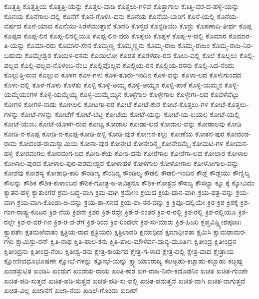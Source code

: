 {ಕೊತ್ತತ್ತಿ
ಕೊತ್ತತ್ತಿಯ
ಕೊತ್ತತ್ತಿ-ಯನ್ನು
ಕೊತ್ತಲ-ವಾಡಿ
ಕೊತ್ತಲು-ಗಳಿವೆ
ಕೊತ್ತಾಗಾಲ
ಕೊತ್ತಿ-ವರ-ದ-ಹಳ್ಳಿ-ಯನ್ನು
ಕೊನಯ
ಕೊನೆಗಾಲ-ದಲ್ಲಿ
ಕೊನೆಗೆ
ಕೊನೆ-ಗೊಳಿಸಿ-ದನು
ಕೊನೆಯ
ಕೊನೆಯ-ಬಾರಿಗೆ
ಕೊನೆ-ಯಲ್ಲಿ
ಕೊನೆಯ-ವರ್ಷದ
ಕೊನೆ-ಯಾದ
ಕೊನೆಯು-ಸಿರೆಳೆಯುತ್ತಾನೆ
ಕೊನೆರಿ
ಕೊನ್ತದ
ಕೊನ್ದಡಿಯು
ಕೊನ್ದು
ಕೊಪಣಾದಿ-ತೀರ್ಥ
ಕೊಪ್ಪ
ಕೊಪ್ಪದ
ಕೊಪ್ಪ-ಲಿನ
ಕೊಪ್ಪ-ಲಿನಲ್ಲಿಯೂ
ಕೊಪ್ಪ-ಲಿನ-ವರು
ಕೊಪ್ಪಲು
ಕೊಪ್ಪಳ
ಕೊಪ್ಪ-ಳ-ದಲ್ಲಿ
ಕೊಮಾರ
ಕೊಮಾರ-ತಿ-ಯನ್ನು
ಕೊಮಾ-ರರು
ಕೊಮಾರ-ಸೇನ
ಕೊಮ್ಮಣ್ಣ
ಕೊಮ್ಮಣ್ಣನು
ಕೊಮ್ಮ-ರಾಜ
ಕೊಮ್ಮ-ರಾಜಂ
ಕೊಮ್ಮ-ರಾಜ-ನಿರ-ಬಹುದು
ಕೊಮ್ಮೇಶ್ವರ
ಕೊಯಳ-ರಸನು
ಕೊಯಿಲೋ
ಕೊರತೆ
ಕೊರಳಹಾ-ರದ
ಕೊಲು-ವಲ್ಲಿ
ಕೊಲೆ
ಕೊಲ್ಲಲು
ಕೊಲ್ಲಿ-ಪಲ್ಲವ
ಕೊಲ್ಲಿ-ಪಲ್ಲವ-ನೊಳಂಬ-ನೆಂಬ
ಕೊಲ್ಲಿಪೊಲ್ಲವ
ಕೊಲ್ಲಿಯ-ರಸ
ಕೊಲ್ಲಿಯ-ರಸನು
ಕೊಲ್ಲಿ-ಸಿದ-ನೆಂದು
ಕೊಲ್ಲುತ್ತಿ-ರುವ
ಕೊಲ್ಲುವ
ಕೊಳಗ
ಕೊಳ-ಗಳು
ಕೊಳ-ತೂರು-ಇಂದಿನ
ಕೊಳ-ವನ್ನು
ಕೊಳಾ-ಲದ
ಕೊಳುಗುಂದದ
ಕೊಳು-ವಲ್ಲಿ
ಕೊಳೆ-ಗೊಳು
ಕೊಳೆತು
ಕೊಳ್ಳಿ
ಕೊಳ್ಳಿ-ಅಯ್ಯ
ಕೊಳ್ಳಿ-ಅಯ್ಯನ
ಕೊಳ್ಳಿ-ಪಾಕೆ
ಕೊಳ್ಳಿ-ಯಮ್ಮನ
ಕೊಳ್ಳಿ-ಯಮ್ಮೆಯಂಗಳ
ಕೊಳ್ಳಿ-ಯಮ್ಮೆಯ್ಯ
ಕೊಳ್ಳಿ-ಯಮ್ಮೆಯ್ಯನ
ಕೊಳ್ಳೆಗಾಲ
ಕೊಳ್ಳೇಗಾಲ
ಕೊಳ್ಳೇಗಾ-ಲದ
ಕೊವಳೆವೆಟ್ಟು
ಕೋಗಳಿ
ಕೋಗಳಿ-ನಾಡು
ಕೋಗಿಲಲಿ
ಕೋಟಗಾ-ರರ
ಕೋಟೆ
ಕೋಟೆ-ಕುರ
ಕೋಟೆ-ಕೊತ್ತಲು-ಗಳ
ಕೋಟೆ-ಕೊತ್ತಲು-ಗಳನ್ನು
ಕೋಟೆ-ಗಳನ್ನು
ಕೋಟೆಗೆ
ಕೋಟೆ-ಬೆಟ್ಟ
ಕೋಟೆಯ
ಕೋಟೆ-ಯನ್ನು
ಕೋಟೆ-ಯ-ಬಯಲ
ಕೋಟೆ-ಯಲ್ಲಿ
ಕೋಟೆ-ಯೆಂಬ
ಕೋಟೆ-ಯೊಳಗಿ-ರುವ
ಕೋಟ್ಟ
ಕೋಡಾಲ
ಕೋಡಾ-ಲದ
ಕೋಡಾಲ-ವನ್ನು
ಕೋಡಾಲವು
ಕೋಡಿ
ಕೋಡಿ-ನ-ಕೊಪ್ಪ
ಕೋಡಿ-ನ-ಕೊಪ್ಪ-ಕೋಡಿ-ಹಳ್ಳಿ
ಕೋಡಿ-ಪುರ
ಕೋಣನ-ಕಲ್ಲು
ಕೋಣೆಯ
ಕೋತನ-ಪುರ
ಕೋದಂಡ-ರಾಮ
ಕೋದಂಡ-ರಾಮಸ್ವಾಮಿಯ
ಕೋನಾ-ಪುರ
ಕೋನೇಟಿ
ಕೋನೇರಿನ್ಮೈ
ಕೋನೇರಿಮ್ಮೈ
ಕೋಮಟಿ-ಗಳ
ಕೋಮನ-ಹಳ್ಳಿ
ಕೋರವಂಗಲ
ಕೋರವಂಗ-ಲದ
ಕೋರಿ-ಕೆಯ
ಕೋರಿ-ದನು
ಕೋರೆಗಾಲ
ಕೋರೆಗಾ-ಲದ
ಕೋಲಾರ
ಕೋಳಾಲ
ಕೋಳಾಲ-ಪುರದ
ಕೋಳಾಲ-ಪುರ-ಪರಮೇಶ್ವರ
ಕೋಳಾಹಳ
ಕೋಳಿಗಾಲ
ಕೋಳೋಗಾಲ
ಕೋಳೋಗಾಲ-ವನ್ನು
ಕೋಶವು
ಕೋಶಸ್ಯ
ಕೋಶಾಧಿ-ಕಾರಿ
ಕೌಂಡಿಣ್ಯ
ಕೌಂಡಿನ್ಯ
ಕೌಂಡಿಲ್ಯ
ಕೌಡಲಿ
ಕೌಡಲಿ-ಇಂದಿನ
ಕೌಡ್ಲೆ
ಕೌಡ್ಲೆಯು
ಕೌಣ್ಡಿಲ್ಯ
ಕೌಲನ್ನು
ಕೌಶಿಕ
ಕೌಶಿಕ-ಕುಳಾಂಬರ
ಕೌಶಿಕ-ಗೋತ್ರ-ಅ-ಪವಿತ್ರನೂ
ಕೌಶಿಕ-ಗೋತ್ರದ
ಕೌಸಲ್ಯ
ಕೌಸಲ್ಯಾ
ಕ್ಕೂ
ಕ್ಕೆ
ಕ್ಕೋವಿದಂ
ಕ್ಯಾತನ-ಹಳ್ಳಿ
ಕ್ಯಾತುಂಗೆರೆ
ಕ್ರಮ-ಬದ್ಧ-ವಾಗಿ
ಕ್ರಮ-ವಾಗಿ
ಕ್ರಮೇಣ
ಕ್ರಯದ
ಕ್ರಯ-ದಾನ-ವಾಗಿ
ಕ್ರಯ-ಪತ್ರ-ವನ್ನು
ಕ್ರಯ-ವಾಗಿ
ಕ್ರಯ-ವಾಗಿ-ಕೊಂಡು-ಅ-ದನ್ನು
ಕ್ರಯ-ಶಾ-ಸನದ
ಕ್ರಯ-ಶಾ-ಸನ-ವನ್ನು
ಕ್ರಿ
ಕ್ರಿಪೂ-ದಲ್ಲಿಯೇ
ಕ್ರಿರ
ಕ್ರಿಶ
ಕ್ರಿಶಕ್ಕೆ
ಕ್ರಿಶ-ಗಂಗ-ರಾಷ್ಟ್ರ-ಕೂಟರ
ಕ್ರಿಶ-ನೆಯ
ಕ್ರಿಶನೇ
ಕ್ರಿಶರ
ಕ್ರಿಶ-ರದ್ದೇ
ಕ್ರಿಶ-ರ-ನಂತರ
ಕ್ರಿಶ-ರ-ರಲ್ಲಿ
ಕ್ರಿಶ-ರಲ್ಲಿ
ಕ್ರಿಶ-ರಲ್ಲಿಯೂ
ಕ್ರಿಶ-ರಲ್ಲೇ
ಕ್ರಿಶ-ರ-ವರೆ-ಗಿನ
ಕ್ರಿಶ-ರ-ವ-ರೆಗೆ
ಕ್ರಿಶ-ರಿಂದ
ಕ್ರಿಶ-ರಿಂದಲೇ
ಕ್ರಿಶ-ಸು-ಮಾರು
ಕ್ರಿಶ-ಹಿಜರಿ
ಕ್ಲಪ್ತವಿಷ್ಣ್ವೀಶಪೂಜಃ
ಕ್ವ್ಮಾಪತೇಃ
ಕ್ಷತಮಱೆವಾತಂ
ಕ್ಷತ್ರಿಯ-ರಾದ
ಕ್ಷತ್ರಿಯರು
ಕ್ಷತ್ರಿಲಾಡರಿ
ಕ್ಷಮಾಧೀಶ
ಕ್ಷಮಾಧೀಶತಾ
ಕ್ಷಮಿಸಿ
ಕ್ಷಾಮಢಾಮರ-ಗಳು
ಕ್ಷಾಮಿಸ್ಫು-ರನ್
ಕ್ಷಿತಿ-ನಾಥ
ಕ್ಷಿತಿ-ಪಾಲ-ಕನು
ಕ್ಷಿತಿ-ಪಾಲ-ಮೌಳಿರ್ವ-ದಾನ್ಯ-ಮೂರ್ತಿಃ
ಕ್ಷಿತೀಂದ್ರ
ಕ್ಷಿತೀಂದ್ರನ
ಕ್ಷಿತೀಂದ್ರನು
ಕ್ಷಿತೀಂದ್ರ-ನೆಂಬ
ಕ್ಷಿತೀಶ್ವ-ರನು
ಕ್ಷೇತ್ರ-ಕಾರ್ಯದ
ಕ್ಷೇತ್ರ-ಗ-ಳಾದ
ಕ್ಷೇತ್ರ-ದಲ್ಲಿ
ಕ್ಷೇತ್ರ-ವಾದ
ಕ್ಷೇತ್ರಾಯ
ಕ್ಷೋಣೀವಧೂಭೂಷಣೇ
ಕ್ಷೋಭೆ-ಗಳನ್ನು
ಕ್ಷೋಭೆ-ಯನ್ನು
ಕ್ಷ್ಮಾಯಾಂರಾಜ್ಯ
ಕೞಅ್ಬಹು-ಕೞ್ಬಾಹು-ಕಬ್ಬಾಹು
ಕೞ್ಬಪ್ಪು
ಖಂಡಸ್ಫುಟಿತ
ಖಂಡಿಸಿ
ಖಂಡುಗ
ಖಂಡೆಯ-ರಾಯ
ಖಂತಿ-ಕಾರ
ಖಗ-ರಾಜ-ನಿನೇ-ಕದೊಡನಿಂ
ಖಚಿತ
ಖಚಿತ-ಗುಂಪೇ
ಖಚಿತ-ಪಡಿ-ಸುತ್ತದೆ
ಖಚಿತ-ಪಡಿ-ಸುತ್ತವೆ
ಖಚಿತ-ಪಡಿ-ಸು-ವಲ್ಲಿ
ಖಚಿತ-ಪಡುತ್ತದೆ
ಖಚಿತ-ವಾಗಿ
ಖಚಿತ-ವಾಗುತ್ತದೆ
ಖಚಿತ-ವಿಲ್ಲ
ಖಜಾನೆಗೆ
ಖಜಾ-ನೆಯ
ಖಡಿಲೆ-ಗೊಂಡು
ಖದೀರ್
}
